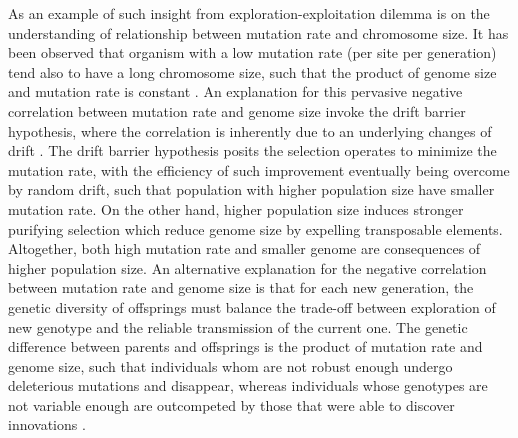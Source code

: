 As an example of such insight from exploration-exploitation dilemma is on the understanding of relationship between mutation rate and chromosome size.
It has been observed that organism with a low mutation rate (per site per generation) tend also to have a long chromosome size, such that the product of genome size and mutation rate is constant \cite{Drake1991}.
An explanation for this pervasive negative correlation between mutation rate and genome size invoke the drift barrier hypothesis, where the correlation is inherently due to an underlying changes of \gls{drift} \citep{Lynch2016a}.
The drift barrier hypothesis posits the selection operates to minimize the mutation rate, with the efficiency of such improvement eventually being overcome by random \gls{drift}, such that population with higher population size have smaller mutation rate. 
On the other hand, higher population size induces stronger purifying selection which reduce genome size by expelling transposable elements.
Altogether, both high mutation rate and smaller genome are consequences of higher population size.
An alternative explanation for the negative correlation between mutation rate and genome size is that for each new generation, the genetic diversity of offsprings must balance the trade-off between exploration of new genotype and the reliable transmission of the current one.
The genetic difference between parents and offsprings is the product of mutation rate and genome size, such that individuals whom are not robust enough undergo deleterious mutations and disappear, whereas individuals whose genotypes are not variable enough are outcompeted by those that were able to discover innovations \citep{Knibbe2007, Beslon2010, Hindre2012, Batut2014, Biller2016}.


